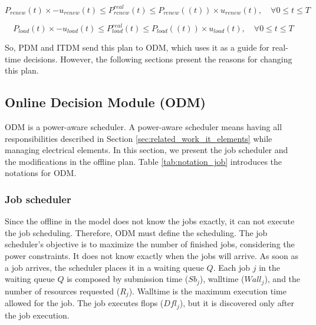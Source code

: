 \begin{equation}
    P_{renew}(t) \times -u_{renew}(t) \le P^{real}_{renew}(t) \le P_{renew}((t)) \times u_{renew}(t), \quad \forall 0 \le t \le T
    \label{equ:uncertainty_power}
\end{equation}

\begin{equation}
    P_{load}(t) \times -u_{load}(t) \le P^{real}_{load}(t) \le P_{load}((t)) \times u_{load}(t), \quad \forall 0 \le t \le T
    \label{equ:uncertainty_load}
\end{equation}

So, PDM and ITDM send this plan to ODM, which uses it as a guide for real-time decisions. However, the following sections present the reasons for changing this plan.

\subsection{Online Decision Module (ODM)}

ODM is a power-aware scheduler. A power-aware scheduler means having all responsibilities described in Section \ref{sec:related_work_it_elements} while managing electrical elements. In this section, we present the job scheduler and the modifications in the offline plan. Table \ref{tab:notation_job} introduces the notations for ODM.



\subsubsection{Job scheduler}

Since the offline in the model does not know the jobs exactly, it can not execute the job scheduling. Therefore, ODM must define the scheduling. The job scheduler's objective is to maximize the number of finished jobs, considering the power constraints. It does not know exactly when the jobs will arrive. As soon as a job arrives, the scheduler places it in a waiting queue $Q$. Each job $j$ in the waiting queue $Q$ is composed by submission time ($Sb_j$), walltime ($Wall_j$), and the number of resources requested ($R_j$). Walltime is the maximum execution time allowed for the job. The job executes flops ($Dfl_j$), but it is discovered only after the job execution.

